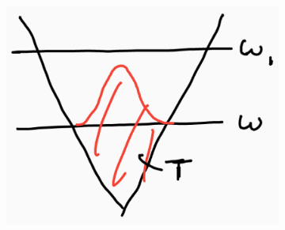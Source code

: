 \documentclass[12pt,a4paper]{article}
\begin{document}
\begin{figure}[h]
\begin{center}
\begin{subfigure}[b]{0.3\textwidth}
    \end{subfigure}
    \begin{subfigure}[b]{0.3\textwidth}
        \includegraphics[scale=0.19]{6}
    \end{subfigure}
\end{center}
\end{figure}
\end{document}
